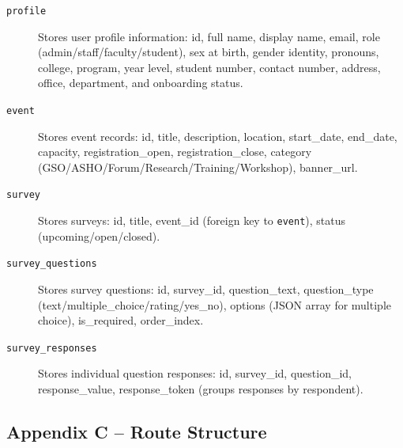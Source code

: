 \documentclass[11pt,a4paper]{article}
\begin{document}
\begin{description}
  \item[\texttt{profile}] Stores user profile information: id, full name, display name, email, role (admin/staff/faculty/student), sex at birth, gender identity, pronouns, college, program, year level, student number, contact number, address, office, department, and onboarding status.

  \item[\texttt{event}] Stores event records: id, title, description, location, start\_date, end\_date, capacity, registration\_open, registration\_close, category (GSO/ASHO/Forum/Research/Training/Workshop), banner\_url.

  \item[\texttt{survey}] Stores surveys: id, title, event\_id (foreign key to \texttt{event}), status (upcoming/open/closed).

  \item[\texttt{survey\_questions}] Stores survey questions: id, survey\_id, question\_text, question\_type (text/multiple\_choice/rating/yes\_no), options (JSON array for multiple choice), is\_required, order\_index.

  \item[\texttt{survey\_responses}] Stores individual question responses: id, survey\_id, question\_id, response\_value, response\_token (groups responses by respondent).
\end{description}


\subsection*{Appendix C -- Route Structure}
\end{document}
